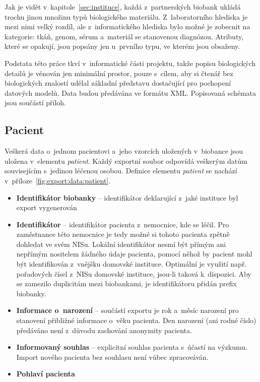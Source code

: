 \documentclass[11pt, final, oneside]{fithesis2}
\newcommand{\polozka}[1]{\item {\bf #1}\xspace}
\begin{document}
Jak je vidět v~kapitole~\ref{sec:instituce}, každá z~partnerských biobank ukládá trochu jinou množinu typů biologického materiálu. Z~laboratorního hlediska je mezi nimi velký rozdíl, ale z~informatického hlediska bylo možné je zobecnit na kategorie: tkáň, genom, sérum a~materiál se stanovenou diagnózou. Atributy, které se opakují, jsou popsány jen u~prvního typu, ve kterém jsou obsaženy.

Podstata této práce tkví v~informatické části projektu, takže popisu biologických detailů je věnován jen minimální prostor, pouze s~cílem, aby si čtenář bez biologických znalostí udělal základní představu dostačující pro pochopení datových modelů.
Data budou předávána ve formátu XML. Popisovaná schémata jsou součástí příloh.

\subsection{Pacient}
Veškerá data o~jednom pacientovi a~jeho vzorcích uložených v~biobance jsou uložena v~elementu \textit{patient}. Každý exportní soubor odpovídá veškerým datům souvisejícím s~jedinou léčenou osobou. Definice elementu \textit{patient} se nachází v~příloze~\ref{fig:export:data:patient}.

\begin{itemize}
		\polozka{Identifikátor biobanky} -- identifikátor deklarující z~jaké instituce byl export vygenerován

		\polozka{Identifikátor} -- identifikátor pacienta z~nemocnice, kde se léčil. Pro zaměstnance této nemocnice je tedy možné si tohoto pacienta zpětně dohledat ve svém NISu. Lokální identifikátor nesmí být přímým ani nepřímým nositelem žádného údaje pacienta, pomocí něhož by pacient mohl být identifikován z~vnějšku domovské instituce. Optimální je využití např. pořadových čísel z~NISu domovské instituce, jsou-li taková k~dispozici. Aby se zamezilo duplicitám mezi biobankami, je identifikátoru přidán prefix biobanky.
		
		\polozka{Informace o~narození} -- součástí exportu je rok a~měsíc narození pro stanovení přibližné informace o~věku pacienta. Den narození (ani rodné číslo) předáváno není z~důvodu zachování anonymity pacienta.
		
		\polozka{Informovaný souhlas} -- explicitní souhlas pacienta s~účastí na výzkumu. Import nového pacienta bez souhlasu není vůbec zpracováván.
			
		\polozka{Pohlaví pacienta}
		
	\end{itemize}
\end{document}
